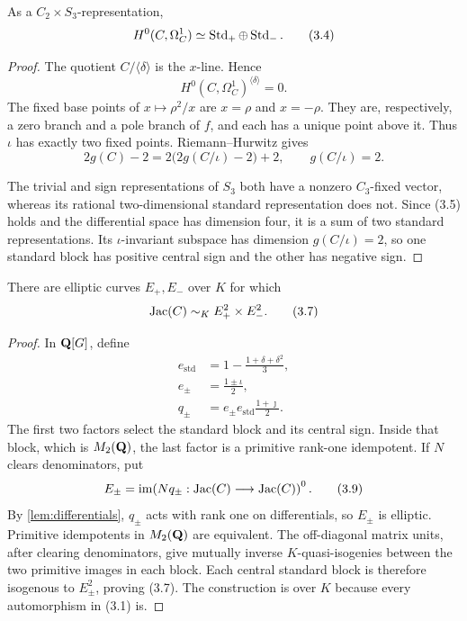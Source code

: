 \begin{lemma}\label{lem:differentials}
As a \(C_2\times S_3\)-representation,
\[
 H^0(C,\Omega_C^1)\simeq\operatorname{Std}_+\oplus\operatorname{Std}_-.             \tag{3.4}
\]
\end{lemma}

\begin{proof}
The quotient \(C/\langle\delta\rangle\) is the \(x\)-line.  Hence
\[
 H^0(C,\Omega_C^1)^{\langle\delta\rangle}=0.            \tag{3.5}
\]
The fixed base points of \(x\mapsto\rho^2/x\) are \(x=\rho\) and
\(x=-\rho\).  They are, respectively, a zero branch and a pole branch of
\(f\), and each has a unique point above it.  Thus \(\iota\) has exactly two
fixed points.  Riemann--Hurwitz gives
\[
 2g(C)-2=2\bigl(2g(C/\iota)-2\bigr)+2,
 \qquad g(C/\iota)=2.                                  \tag{3.6}
\]

The trivial and sign representations of \(S_3\) both have a nonzero
\(C_3\)-fixed vector, whereas its rational two-dimensional standard
representation does not.  Since (3.5) holds and the differential space has
dimension four, it is a sum of two standard representations.  Its
\(\iota\)-invariant subspace has dimension \(g(C/\iota)=2\), so one
standard block has positive central sign and the other has negative sign.
\end{proof}

\begin{theorem}\label{thm:jac-decomposition}
There are elliptic curves \(E_+,E_-\) over \(K\) for which
\[
 \operatorname{Jac}(C)\sim_K E_+^2\times E_-^2.                       \tag{3.7}
\]
\end{theorem}

\begin{proof}
In \(\mathbf Q[G]\), define
\[
\begin{aligned}
 e_{\mathrm{std}}
 &=1-\frac{1+\delta+\delta^2}{3},\\
 e_\pm&=\frac{1\pm\iota}{2},\\
 q_\pm&=e_\pm e_{\mathrm{std}}\frac{1+\jmath}{2}.
\end{aligned}                                           \tag{3.8}
\]
The first two factors select the standard block and its central sign.
Inside that block, which is \(M_2(\mathbf Q)\), the last factor is a primitive
rank-one idempotent.  If \(N\) clears denominators, put
\[
 E_\pm=\operatorname{im}\!\left(Nq_\pm:\operatorname{Jac}(C)\longrightarrow\operatorname{Jac}(C)\right)^0.
                                                                  \tag{3.9}
\]
By \cref{lem:differentials}, \(q_\pm\) acts with rank one on
differentials, so \(E_\pm\) is elliptic.  Primitive idempotents in
\(M_2(\mathbf Q)\) are equivalent.  The off-diagonal matrix units, after clearing
denominators, give mutually inverse \(K\)-quasi-isogenies between the two
primitive images in each block.  Each central standard block is therefore
isogenous to \(E_\pm^2\), proving (3.7).  The construction is over \(K\)
because every automorphism in (3.1) is.
\end{proof}

